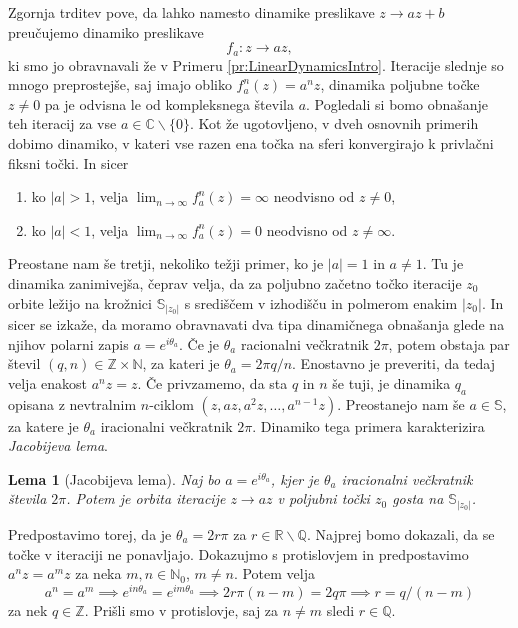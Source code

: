 \documentclass[12pt,a4paper]{amsart}
\theoremstyle{definition} %
\theoremstyle{plain} %
\newtheorem{lema}[definicija]{Lema}
\newcommand{\R}{\mathbb R}
\newcommand{\N}{\mathbb N}
\newcommand{\Z}{\mathbb Z}
\newcommand{\CC}{\mathbb C}
\newcommand{\Q}{\mathbb Q}
\newcommand{\SSS}{\mathbb S} %
\begin{document}
Zgornja trditev pove, da lahko namesto dinamike preslikave $z \to az + b$ preučujemo dinamiko preslikave
$$f_a \colon z \to az,$$
ki smo jo obravnavali že v Primeru \ref{pr:LinearDynamicsIntro}.
Iteracije slednje so mnogo preprostejše, saj imajo obliko $f_a^n(z) = a^nz$,
dinamika poljubne točke $z\neq0$ pa je odvisna le od kompleksnega števila $a$. 
Pogledali si bomo obnašanje teh iteracij za vse $a\in\CC\smallsetminus\{0\}$. 
Kot že ugotovljeno, v dveh osnovnih primerih dobimo dinamiko, v kateri vse razen ena točka na sferi konvergirajo k privlačni fiksni točki.
In sicer
\begin{enumerate}
\item ko $|a|> 1$, velja $\lim_{n\to\infty}f_a^n(z) = \infty$ neodvisno od $z \neq 0$,
\item ko $|a| < 1$, velja $\lim_{n\to\infty}f_a^n(z) = 0$ neodvisno od $z \neq \infty$.
\end{enumerate}
Preostane nam še tretji, nekoliko težji primer, ko je $|a| = 1$ in $a\neq 1$. 
Tu je dinamika zanimivejša, čeprav velja, da za poljubno začetno točko iteracije $z_0$ orbite ležijo na
krožnici $\SSS_{|z_0|}$ s središčem v izhodišču in polmerom enakim $|z_0|.$ 
In sicer se izkaže, da moramo obravnavati dva tipa dinamičnega obnašanja glede na njihov polarni zapis $a=e^{i \theta_a}$.
Če je $\theta_a$ racionalni večkratnik $2\pi$, potem obstaja par števil $(q, n) \in \Z \times \N$, 
za kateri je $\theta_a = 2 \pi q / n$. Enostavno je preveriti, da tedaj velja enakost $a^nz = z$.
Če privzamemo, da sta $q$ in $n$ še tuji, je dinamika $q_a$ opisana z nevtralnim $n$-ciklom $(z, az, a^2z, \dots, a^{n-1}z)$.
Preostanejo nam še $a \in \SSS$, za katere je $\theta_a$ iracionalni večkratnik $2\pi$.
Dinamiko tega primera karakterizira {\em Jacobijeva lema}.

\begin{lema}[Jacobijeva lema]\label{lema:Jacobi}
Naj bo $a = e^{i\theta_a}$, kjer je $\theta_a$ iracionalni večkratnik števila $2\pi$. 
Potem je orbita iteracije $z \to az$ v poljubni točki $z_0$ gosta na $\SSS_{|z_0|}$.
\end{lema}

\proof
Predpostavimo torej, da je $\theta_a = 2r\pi$ za $r \in \R \smallsetminus \Q$.
Najprej bomo dokazali, da se točke v iteraciji ne ponavljajo.
Dokazujmo s protislovjem in predpostavimo $a^nz = a^mz$ za neka 
$m,n \in \N_0$, $m \neq n$. Potem velja
$$a^n = a^m \implies e^{in\theta_a} = e^{im\theta_a} \implies 2r\pi (n - m) = 2q\pi \implies r = q / (n-m)$$
za nek $q \in \Z$. Prišli smo v protislovje, saj za $n \neq m$ sledi $r \in \Q$.
\end{document}

